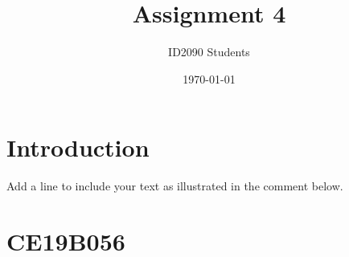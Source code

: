 \documentclass[a4paper, 12pt]{article}
\begin{document}
\title{Assignment 4}
\author{ID2090 Students}
\date{\today}
\maketitle

\tableofcontents

\section{Introduction}
Add a line to include your text as illustrated in the comment below.

\section{CE19B056}

\end{document}
